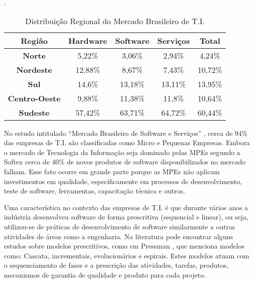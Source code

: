 \begin{table}[H]
\centering
\caption{Distribuição Regional do Mercado Brasileiro de T.I. \cite{abes-software2016}}.
\label{tab:1.1}
\begin{tabular}{|c|c|c|c|c|}
\hline
\textbf{Região}       & \textbf{Hardware} & \textbf{Software} & \textbf{Serviços} & \textbf{Total} 
    \\ \hline
\textbf{Norte}        & 5,22\%            & 3,06\%            & 2,94\%            & 4,24\%         
    \\ \hline
\textbf{Nordeste}     & 12,88\%           & 8,67\%            & 7,43\%            & 10,72\%        
    \\ \hline
\textbf{Sul}          & 14,6\%            & 13,18\%           & 13,11\%           & 13,95\%          
    \\ \hline
\textbf{Centro-Oeste} & 9,88\%            & 11,38\%           & 11,8\%            & 10,64\%        
    \\ \hline
\textbf{Sudeste}      & 57,42\%           & 63,71\%           & 64,72\%           & 60,44\%        
    \\ \hline
\end{tabular}
\end{table}

No estudo intitulado “Mercado Brasileiro de Software e Serviços” \cite{abes-software2016}, cerca de 94\% das empresas de T.I. são classificadas como Micro e Pequenas Empresas. Embora o mercado de Tecnologia da Informação seja dominado pelas MPEs segundo a Softex \cite{GuiaMPTbr} cerca de 40\% de novos produtos de software disponibilizados no mercado falham. Esse fato ocorre em grande parte porque as MPEs não aplicam investimentos em qualidade, especificamente em processos de desenvolvimento, teste de software, ferramentas, capacitação técnica e outros.

Uma característica no contexto das empresas de T.I. é que durante vários anos a indústria desenvolveu software de forma prescritiva (sequencial e linear), ou seja, utilizou-se de práticas de desenvolvimento de software similarmente a outras atividades de áreas como a engenharia. Na literatura pode encontrar alguns estudos sobre modelos prescritivos, como em Pressman \cite{PRESSMAN2011}, que menciona modelos como: Cascata, incrementais, evolucionários e espirais. Estes modelos atuam com o sequenciamento de fases e a prescrição das atividades, tarefas, produtos, mecanismos de garantia de qualidade e produto para cada projeto. 

